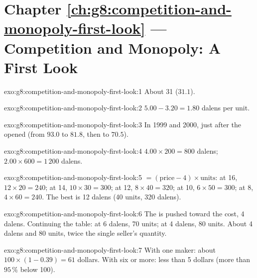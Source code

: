 \section*{Chapter \ref{ch:g8:competition-and-monopoly-first-look} --- Competition and Monopoly: A First Look}

\begin{solution}{exo:g8:competition-and-monopoly-first-look:1}
About 31 ($31.1$).
\end{solution}

\begin{solution}{exo:g8:competition-and-monopoly-first-look:2}
$5.00 - 3.20 = 1.80$ dalens per unit.
\end{solution}

\begin{solution}{exo:g8:competition-and-monopoly-first-look:3}
In 1999 and 2000, just after the  opened (from $93.0$ to $81.8$, then to $70.5$).
\end{solution}

\begin{solution}{exo:g8:competition-and-monopoly-first-look:4}
$4.00 \times 200 = 800$ dalens; $2.00 \times 600 = 1\,200$ dalens.
\end{solution}

\begin{solution}{exo:g8:competition-and-monopoly-first-look:5}
 $= (\text{price} - 4) \times \text{units}$: at 16, $12 \times 20 = 240$; at 14, $10 \times 30 =
300$; at 12, $8 \times 40 = 320$; at 10, $6 \times 50 = 300$; at 8, $4 \times 60 = 240$. The best
 is 12 dalens (40 units,  320 dalens).
\end{solution}

\begin{solution}{exo:g8:competition-and-monopoly-first-look:6}
The  is pushed toward the cost, 4 dalens. Continuing the table: at 6 dalens, 70 units; at 4
dalens, 80 units. About 4 dalens and 80 units, twice the single seller's quantity.
\end{solution}

\begin{solution}{exo:g8:competition-and-monopoly-first-look:7}
With one maker: about $100 \times (1 - 0.39) = 61$ dollars. With six or more: less than 5 dollars
(more than $95\,\%$ below 100).
\end{solution}

